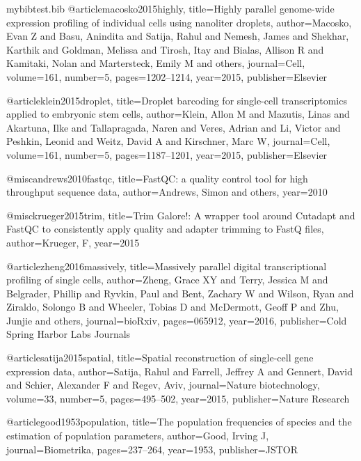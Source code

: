 \RequirePackage{filecontents}
\begin{filecontents}{mybibtest.bib}
@article{macosko2015highly,
  title={Highly parallel genome-wide expression profiling of individual cells using nanoliter droplets},
  author={Macosko, Evan Z and Basu, Anindita and Satija, Rahul and Nemesh, James and Shekhar, Karthik and Goldman, Melissa and Tirosh, Itay and Bialas, Allison R and Kamitaki, Nolan and Martersteck, Emily M and others},
  journal={Cell},
  volume={161},
  number={5},
  pages={1202--1214},
  year={2015},
  publisher={Elsevier}
}

@article{klein2015droplet,
  title={Droplet barcoding for single-cell transcriptomics applied to embryonic stem cells},
  author={Klein, Allon M and Mazutis, Linas and Akartuna, Ilke and Tallapragada, Naren and Veres, Adrian and Li, Victor and Peshkin, Leonid and Weitz, David A and Kirschner, Marc W},
  journal={Cell},
  volume={161},
  number={5},
  pages={1187--1201},
  year={2015},
  publisher={Elsevier}
}

@misc{andrews2010fastqc,
  title={FastQC: a quality control tool for high throughput sequence data},
  author={Andrews, Simon and others},
  year={2010}
}

@misc{krueger2015trim,
  title={Trim Galore!: A wrapper tool around Cutadapt and FastQC to consistently apply quality and adapter trimming to FastQ files},
  author={Krueger, F},
  year={2015}
}

@article{zheng2016massively,
  title={Massively parallel digital transcriptional profiling of single cells},
  author={Zheng, Grace XY and Terry, Jessica M and Belgrader, Phillip and Ryvkin, Paul and Bent, Zachary W and Wilson, Ryan and Ziraldo, Solongo B and Wheeler, Tobias D and McDermott, Geoff P and Zhu, Junjie and others},
  journal={bioRxiv},
  pages={065912},
  year={2016},
  publisher={Cold Spring Harbor Labs Journals}
}

@article{satija2015spatial,
  title={Spatial reconstruction of single-cell gene expression data},
  author={Satija, Rahul and Farrell, Jeffrey A and Gennert, David and Schier, Alexander F and Regev, Aviv},
  journal={Nature biotechnology},
  volume={33},
  number={5},
  pages={495--502},
  year={2015},
  publisher={Nature Research}
}

@article{good1953population,
  title={The population frequencies of species and the estimation of population parameters},
  author={Good, Irving J},
  journal={Biometrika},
  pages={237--264},
  year={1953},
  publisher={JSTOR}
}


\end{filecontents}
